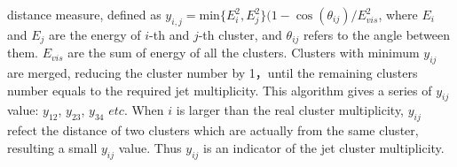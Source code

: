 distance measure, defined as $y_{i,j} = \mathrm{min}\{E^2_i,E^2_j\}(1-\cos(\theta_{ij})/E^2_{vis}$, where $E_i$ and $E_j$ are the energy of 
$i$-th and $j$-th cluster, and $\theta_{ij}$ refers to the angle between them. 
$E_{vis}$ are the sum of energy of all the clusters. Clusters with minimum $y_{ij}$ are merged, reducing the cluster number by 1，until the remaining clusters number 
equals to the required jet multiplicity. This algorithm gives a series of 
$y_{ij}$ value: $y_{12}$, $y_{23}$, $y_{34}$ $etc$. When $i$ is larger than 
the real cluster multiplicity, $y_{ij}$ refect the distance of two clusters 
which are actually from the same cluster, resulting a small $y_{ij}$ value. Thus $y_{ij}$ is an indicator of the jet cluster multiplicity.\par
\clearpage
